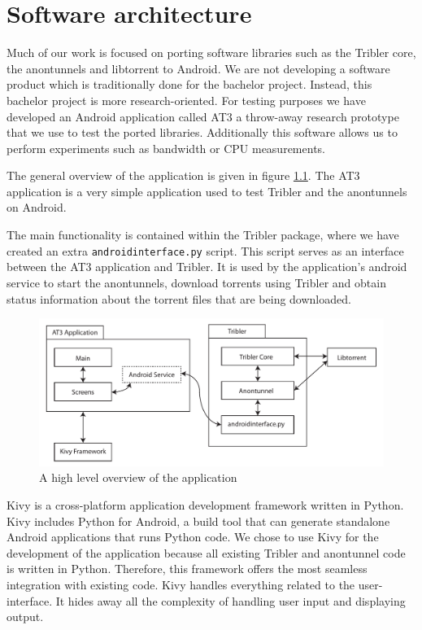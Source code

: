 \chapter{Software architecture}
Much of our work is focused on porting software libraries such as the Tribler core, the anontunnels and libtorrent to Android. We are not developing a software product which is traditionally done for the bachelor project. Instead, this bachelor project is more research-oriented. For testing purposes we have developed an Android application called AT3 a throw-away research prototype that we use to test the ported libraries. Additionally this software allows us to perform experiments such as bandwidth or CPU measurements.

The general overview of the application is given in figure \ref{fig:overview}. The AT3 application is a very simple application used to test Tribler and the anontunnels on Android.

The main functionality is contained within the Tribler package, where we have created an extra \texttt{androidinterface.py} script. This script serves as an interface between the AT3 application and Tribler. It is used by the application's android service to start the anontunnels, download torrents using Tribler and obtain status information about the torrent files that are being downloaded. 

\begin{figure}[!h]
	\centering
	\includegraphics[width=\textwidth]{graphics/overview.pdf}
	\caption{A high level overview of the application}
	\label{fig:overview}
\end{figure}

Kivy is a cross-platform application development framework written in Python. Kivy includes Python for Android, a build tool that can generate standalone Android applications that runs Python code. We chose to use Kivy for the development of the application because all existing Tribler and anontunnel code is written in Python. Therefore, this framework offers the most seamless integration with existing code. Kivy handles everything related to the user-interface. It hides away all the complexity of handling user input and displaying output.

